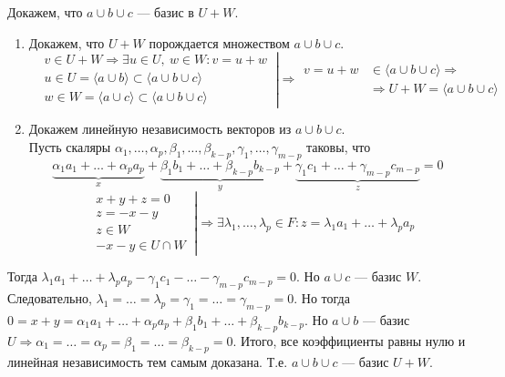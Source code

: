 \documentclass[a4paper, 12pt]{article}
\begin{document}
Докажем, что $a \cup b \cup c$ --- базис в $U + W$.

\vspace{-4mm}
\begin{enumerate}
\item Докажем, что $U + W$ порождается множеством $a \cup b \cup c$.
\vspace{-3mm}
\[
\left.\begin{aligned}
&v \in U + W \Rightarrow \exists u \in U,\ w \in W: v = u + w\ \\
&u \in U = \langle a \cup b \rangle \subset \langle a \cup b \cup c \rangle \\
&w \in W = \langle a \cup c \rangle \subset \langle a \cup b \cup c  \rangle
\end{aligned}\right|\Rightarrow
\begin{aligned}
v = u + w &\in \langle a \cup b \cup c \rangle \Rightarrow \\
&\Rightarrow U + W = \langle a \cup b \cup c \rangle
\end{aligned}
\]
\item Докажем линейную независимость векторов из $a \cup b \cup c$. \\
Пусть скаляры $\alpha_1, \ldots, \alpha_p, \beta_1, \ldots, \beta_{k - p}, \gamma_1, \ldots, \gamma_{m - p}$ таковы, что
\vspace{-3mm}
\[
\underbrace{\alpha_1a_1 + \ldots + \alpha_pa_p}_x +
\underbrace{\beta_1b_1 + \ldots + \beta_{k - p}b_{k - p}}_y +
\underbrace{\gamma_1c_1 + \ldots + \gamma_{m - p}c_{m - p}}_z = 0
\]
\vspace{-4mm}
\[
\left.\begin{aligned}
&x + y + z = 0 \\
&z = -x - y \\
&z \in W \\
&-x - y \in U \cap W\ %
\end{aligned}\right| \Rightarrow
\exists \lambda_1, \ldots, \lambda_p \in F: z = \lambda_1a_1 + \ldots + \lambda_pa_p
\]
\end{enumerate}

Тогда $\lambda_1a_1 + \ldots + \lambda_pa_p - \gamma_1c_1 - \ldots - \gamma_{m - p}c_{m - p} = 0$. Но $a \cup c$ --- базис $W$. Следовательно, $\lambda_1 = \ldots = \lambda_p = \gamma_1 = \ldots = \gamma_{m - p} = 0$. Но тогда $0 = x + y = \alpha_1a_1 + \ldots + \alpha_pa_p + \beta_1b_1 + \ldots + \beta_{k - p}b_{k - p}$. Но $a \cup b$ --- базис $U \Rightarrow \alpha_1 = \ldots = \alpha_p = \beta_1 = \ldots = \beta_{k - p} = 0$. Итого, все коэффициенты равны нулю и линейная независимость тем самым доказана. Т.е. $a \cup b \cup c$ --- базис $U + W$.
\end{document}
